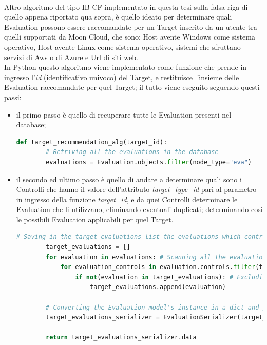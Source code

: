 \ \\
Altro algoritmo del tipo IB-CF implementato in questa tesi sulla falsa riga di quello appena riportato qua sopra, è quello ideato per
determinare quali Evaluation possono essere raccomandate per un Target inserito da un utente tra quelli supportati da Moon Cloud,
che sono: Host avente Windows come sistema operativo, Host avente Linux come sistema operativo, sistemi che sfruttano 
servizi di Aws o di Azure e Url di siti web.\\
In Python questo algoritmo viene implementato come funzione che prende in ingresso l'\textit{id} (identificativo univoco) del Target, e 
restituisce l'insieme delle Evaluation raccomandate per quel Target; il tutto viene eseguito seguendo questi passi:
\begin{itemize}
	\item il primo passo è quello di recuperare tutte le Evaluation presenti nel database;
	\begin{lstlisting}[language=Python, label=lst:IB_CF_Target_1]
	def target_recommendation_alg(target_id):
		# Retriving all the evaluations in the database
		evaluations = Evaluation.objects.filter(node_type="eva")
	\end{lstlisting} 
	\item il secondo ed ultimo passo è quello di andare a determinare quali sono i Controlli che hanno il valore dell'attributo \textit{target\_type\_id}
	pari al parametro in ingresso della funzione \textit{target\_id}, e da quei Controlli determinare le Evaluation che li utilizzano, 
	eliminando eventuali duplicati; determinando così le possibili Evaluation applicabili per quel Target.
	\begin{lstlisting}[language=Python, label=lst:IB_CF_Target_2]
		# Saving in the target_evaluations list the evaluations which controls have target_type_id equal to target_id
		target_evaluations = []
		for evaluation in evaluations: # Scanning all the evaluations
			for evaluation_controls in evaluation.controls.filter(target_type_id=target_id):
				if not(evaluation in target_evaluations): # Excluding evaluations duplicated
					target_evaluations.append(evaluation)
	
		# Converting the Evaluation model's instance in a dict and putting the evaluation, as a dict, in a list
		target_evaluations_serializer = EvaluationSerializer(target_evaluations, many=True)

		return target_evaluations_serializer.data
	\end{lstlisting} 
\end{itemize}

